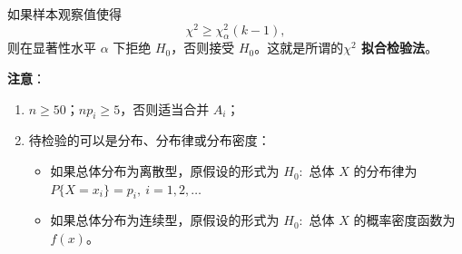\documentclass[11pt,a4paper]{report}
\theoremstyle{definition}
\begin{document}
如果样本观察值使得
\[
\chi^{2}\geq\chi_{\alpha}^{2}(k-1),
\]
则在显著性水平 $\alpha$ 下拒绝 $H_{0}$，否则接受 $H_{0}$。这就是所谓的\textbf{$\chi^{2}$ 拟合检验法}。

\textbf{注意}：
\begin{enumerate}[label=(\arabic*)]
    \item $n\geq 50$；$np_{i}\geq 5$，否则适当合并 $A_{i}$；
    \item 待检验的可以是分布、分布律或分布密度：
    \begin{itemize}
        \item 如果总体分布为离散型，原假设的形式为 $H_{0}\colon$ 总体 $X$ 的分布律为 $P\{X=x_{i}\}=p_{i},\ i=1,2,\ldots$
        \item 如果总体分布为连续型，原假设的形式为 $H_{0}\colon$ 总体 $X$ 的概率密度函数为 $f(x)$。
    \end{itemize}
\end{enumerate}
\end{document}
